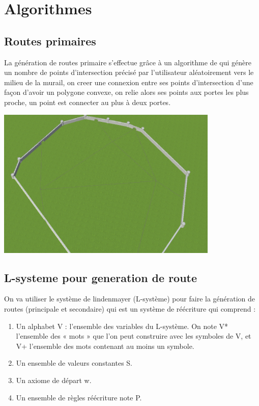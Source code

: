 \section{Algorithmes}

\subsection{Routes primaires}
La génération de routes primaire s’effectue grâce à un algorithme de qui génère un nombre de points d’intersection précisé par l’utilisateur aléatoirement 
vers le milieu de la murail, on creer une connexion entre ses points d’intersection d’une façon d’avoir un polygone convexe, on relie alors ses points 
aux portes les plus proche, un point est connecter au plus à deux portes.

\begin{center}
  \includegraphics[width = 400px]{images/routeprimaire.png}
\end{center}


\subsection{L-systeme pour generation de route}
On va utiliser le système de lindenmayer (L-système) pour faire la génération de routes (principale et secondaire) qui est un système de réécriture qui comprend :

\begin{enumerate}
  \item Un alphabet V : l'ensemble des variables du L-système. On note V* l'ensemble des « mots » que l'on peut construire avec les symboles de V, et V+ l’ensemble des mots contenant au moins un symbole.
  \item Un ensemble de valeurs constantes S.
  \item Un axiome de départ w.
  \item Un ensemble de règles réécriture note P.
\end{enumerate}

